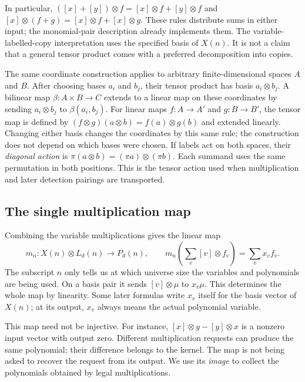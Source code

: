 \documentclass[11pt,a4paper,oneside,openany]{book}
\theoremstyle{definition}\newtheorem{definition}[theorem]{Definition}
\theoremstyle{remark}\newtheorem{remark}[theorem]{Remark}
\numberwithin{equation}{chapter}
\begin{document}
In particular,
$([x]+[y])\otimes f=[x]\otimes f+[y]\otimes f$ and
$[x]\otimes(f+g)=[x]\otimes f+[x]\otimes g$.
These rules distribute sums in either input; the monomial-pair
description already implements them.
The variable-labelled-copy interpretation uses the specified basis
of $X(n)$. It is not a claim that a general tensor product comes
with a preferred decomposition into copies.

The same coordinate construction applies to arbitrary finite-dimensional
spaces $A$ and $B$. After choosing bases $a_i$ and $b_j$, their tensor
product has basis $a_i\otimes b_j$. A bilinear map $\beta:A\times B\to C$
extends to a linear map on these coordinates by sending
$a_i\otimes b_j$ to $\beta(a_i,b_j)$. For linear maps
$f:A\to A'$ and $g:B\to B'$, the tensor map is defined by
$(f\otimes g)(a\otimes b)=f(a)\otimes g(b)$ and extended linearly.
Changing either basis changes the coordinates by this same rule;
the construction does not depend on which bases were chosen.
If labels act on both spaces, their \emph{diagonal action} is
$\pi(a\otimes b)=(\pi a)\otimes(\pi b)$. Each summand uses the same
permutation in both positions. This is the tensor action used when
multiplication and later detection pairings are transported.

\subsection{The single multiplication map}
Combining the variable multiplications gives the linear map
\[
 \boxed{\quad
 m_n:X(n)\otimes L_d(n)\longrightarrow P_d(n),\qquad
 m_n\!\left(\sum_v[v]\otimes f_v\right)=\sum_v x_vf_v.
 \quad}
\]
The subscript $n$ only tells us at which universe size the variables
and polynomials are being used. On a basis pair it sends
$[v]\otimes\mu$ to $x_v\mu$.
This determines the whole map by linearity.
Some later formulas write $x_v$ itself for the basis vector of $X(n)$;
at its output, $x_v$ always means the actual polynomial variable.

This map need not be injective. For instance,
$[x]\otimes y-[y]\otimes x$ is a nonzero input vector with output zero.
Different multiplication requests can produce the same polynomial;
their difference belongs to the kernel.
The map is not being asked to recover the request from its output.
We use its \emph{image} to collect the polynomials obtained by legal
multiplications.
\end{document}
